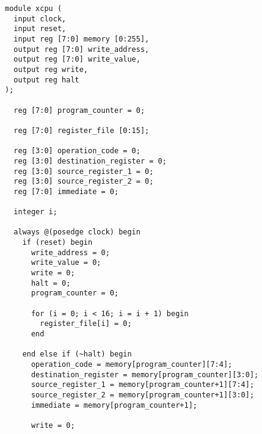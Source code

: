 \documentclass{article}
\begin{document}
\begin{lstlisting}
module xcpu (
  input clock,
  input reset,
  input reg [7:0] memory [0:255],
  output reg [7:0] write_address,
  output reg [7:0] write_value,
  output reg write,
  output reg halt
);

  reg [7:0] program_counter = 0;

  reg [7:0] register_file [0:15];

  reg [3:0] operation_code = 0;
  reg [3:0] destination_register = 0;
  reg [3:0] source_register_1 = 0;
  reg [3:0] source_register_2 = 0;
  reg [7:0] immediate = 0;

  integer i;

  always @(posedge clock) begin
    if (reset) begin
      write_address = 0;
      write_value = 0;
      write = 0;
      halt = 0;
      program_counter = 0;

      for (i = 0; i < 16; i = i + 1) begin
        register_file[i] = 0;
      end

    end else if (~halt) begin
      operation_code = memory[program_counter][7:4];
      destination_register = memory[program_counter][3:0];
      source_register_1 = memory[program_counter+1][7:4];
      source_register_2 = memory[program_counter+1][3:0];
      immediate = memory[program_counter+1];

      write = 0;


\end{lstlisting}
\end{document}
